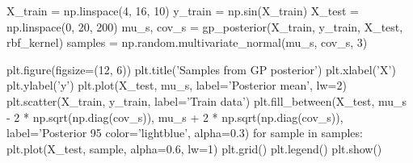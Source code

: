 \documentclass{article}
\begin{document}
\newpage
\begin{python}
X_train = np.linspace(4, 16, 10)
y_train = np.sin(X_train)
X_test = np.linspace(0, 20, 200)
mu_s, cov_s = gp_posterior(X_train, y_train, X_test, rbf_kernel)
samples = np.random.multivariate_normal(mu_s, cov_s, 3)

plt.figure(figsize=(12, 6))
plt.title('Samples from GP posterior')
plt.xlabel('X')
plt.ylabel('y')
plt.plot(X_test, mu_s, label='Posterior mean', lw=2)
plt.scatter(X_train, y_train, label='Train data')
plt.fill_between(X_test, 
                 mu_s - 2 * np.sqrt(np.diag(cov_s)), 
                 mu_s + 2 * np.sqrt(np.diag(cov_s)), 
                 label='Posterior 95%
                 color='lightblue', alpha=0.3)
for sample in samples:
  plt.plot(X_test, sample, alpha=0.6, lw=1)
plt.grid()
plt.legend()
plt.show()
\end{python}
\end{document}
